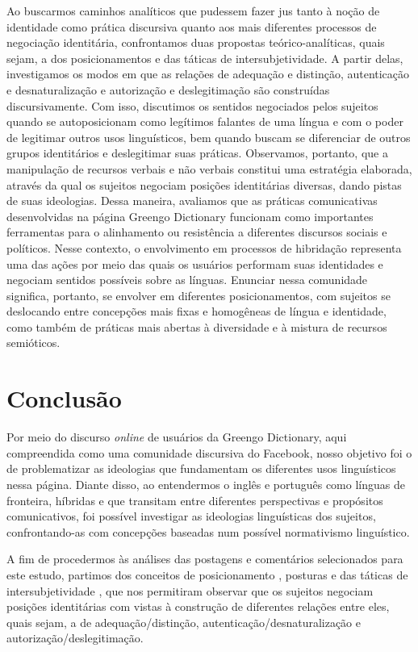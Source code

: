 \documentclass[portuguese]{textolivre}
\begin{document}
Ao buscarmos caminhos analíticos que pudessem fazer jus tanto à noção de identidade como prática discursiva quanto aos mais diferentes processos de negociação identitária, confrontamos duas propostas teórico-analíticas, quais sejam, a dos posicionamentos e das táticas de intersubjetividade. A partir delas, investigamos os modos em que as relações de adequação e distinção, autenticação e desnaturalização e autorização e deslegitimação são construídas discursivamente. Com isso, discutimos os sentidos negociados pelos sujeitos quando se autoposicionam como legítimos falantes de uma língua e com o poder de legitimar outros usos linguísticos, bem quando buscam se diferenciar de outros grupos identitários e deslegitimar suas práticas. Observamos, portanto, que a manipulação de recursos verbais e não verbais constitui uma estratégia elaborada, através da qual os sujeitos negociam posições identitárias diversas, dando pistas de suas ideologias.	Dessa maneira, avaliamos que as práticas comunicativas desenvolvidas na página Greengo Dictionary funcionam como importantes ferramentas para o alinhamento ou resistência a diferentes discursos sociais e políticos. Nesse contexto, o envolvimento em processos de hibridação representa uma das ações por meio das quais os usuários performam suas identidades e negociam sentidos possíveis sobre as línguas. Enunciar nessa comunidade significa, portanto, se envolver em diferentes posicionamentos, com sujeitos se deslocando entre concepções mais fixas e homogêneas de língua e identidade, como também de práticas mais abertas à diversidade e à mistura de recursos semióticos.


\section{Conclusão}\label{sec-modelo}
Por meio do discurso \textit{online} de usuários da Greengo Dictionary, aqui compreendida como uma comunidade discursiva do Facebook, nosso objetivo foi o de problematizar as ideologias que fundamentam os diferentes usos linguísticos nessa página. Diante disso, ao entendermos o inglês e português como línguas de fronteira, híbridas e que transitam entre diferentes perspectivas e propósitos comunicativos, foi possível investigar as ideologias linguísticas dos sujeitos, confrontando-as com concepções baseadas num possível normativismo linguístico.				

A fim de procedermos às análises das postagens e comentários selecionados para este estudo, partimos dos conceitos de posicionamento \cite{harre_positioning_1999}, posturas \cite{barton_linguagem_2015} e das táticas de intersubjetividade \cite{bucholtz_language_2004,bucholtz_identity_2005}, que nos permitiram observar que os sujeitos negociam posições identitárias com vistas à construção de diferentes relações entre eles, quais sejam, a de adequação/distinção, autenticação/desnaturalização e autorização/deslegitimação.	 			
\end{document}
